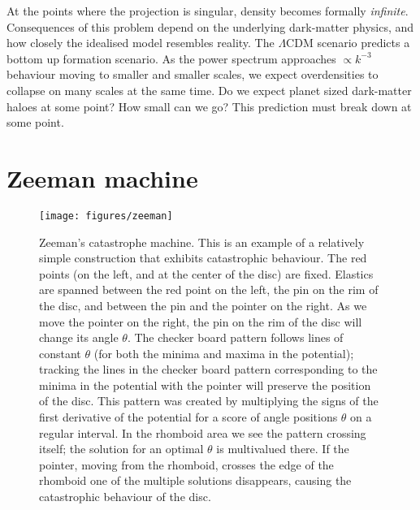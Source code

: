 \begin{subappendices}
At the points where the projection is singular, density becomes formally \emph{infinite}. Consequences of this problem depend on the underlying dark-matter physics, and how closely the idealised model resembles reality. The $\Lambda$CDM scenario predicts a bottom up formation scenario. As the power spectrum approaches $\propto k^{-3}$ behaviour moving to smaller and smaller scales, we expect overdensities to collapse on many scales at the same time. Do we expect planet sized dark-matter haloes at some point? How small can we go? This prediction must break down at some point.



\clearpage
\section{Zeeman machine}\label{section:zeemanmachine}
\begin{figure}[t]
\texttt{[image: figures/zeeman]}
\caption{Zeeman's catastrophe machine. This is an example of a relatively simple construction that exhibits catastrophic behaviour. The red points (on the left, and at the center of the disc) are fixed. Elastics are spanned between the red point on the left, the pin on the rim of the disc, and between the pin and the pointer on the right. As we move the pointer on the right, the pin on the rim of the disc will change its angle $\theta$. The checker board pattern follows lines of constant $\theta$ (for both the minima and maxima in the potential); tracking the lines in the checker board pattern corresponding to the minima in the potential with the pointer will preserve the position of the disc. This pattern was created by multiplying the signs of the first derivative of the potential for a score of angle positions $\theta$ on a regular interval. In the rhomboid area we see the pattern crossing itself; the solution for an optimal $\theta$ is multivalued there. If the pointer, moving from the rhomboid, crosses the edge of the rhomboid one of the multiple solutions disappears, causing the catastrophic behaviour of the disc.}
\label{fig:zeeman}
\end{figure}


\end{subappendices}
